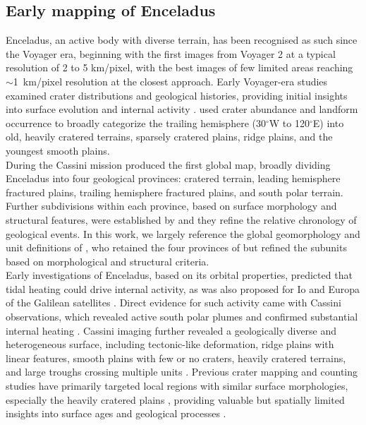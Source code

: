 \documentclass[preprint,11pt,3p,times,authoryear]{elsarticle}
\begin{document}
\subsection{Early mapping of Enceladus}
Enceladus, an active body with diverse terrain, has been recognised as such since the Voyager era, beginning with the first images from Voyager 2 at a typical resolution of 2 to 5 km/pixel, with the best images of few limited areas reaching $\sim$1~km/pixel resolution at the closest approach. Early Voyager-era studies examined crater distributions and geological histories, providing initial insights into surface evolution and internal activity \citep{Smith1982, Plescia1983, Schenk1989, Pozio1990, Kargel1996}. \citet{Smith1982} used crater abundance and landform occurrence to broadly categorize the trailing hemisphere (30$^\circ$W to 120$^\circ$E) into old, heavily cratered terrains, sparsely cratered plains, ridge plains, and the youngest smooth plains. \\

During the Cassini mission \citet{Spencer2009} produced the first global map, broadly dividing Enceladus into four geological provinces: cratered terrain, leading hemisphere fractured plains, trailing hemisphere fractured plains, and south polar terrain. Further subdivisions within each province, based on surface morphology and structural features, were established by \citet{Helfenstein2010} and they refine the relative chronology of geological events. In this work, we largely reference the global geomorphology and unit definitions of \citet{CrowWillard2015}, who retained the four provinces of \citet{Spencer2009} but refined the subunits based on morphological and structural criteria.\\

Early investigations of Enceladus, based on its orbital properties, predicted that tidal heating could drive internal activity, as was also proposed for Io and Europa of the Galilean satellites \citep{Cassen1979, Peale1979}. Direct evidence for such activity came with Cassini observations, which revealed active south polar plumes and confirmed substantial internal heating \citep{Porco2006, Spencer2006}. Cassini imaging further revealed a geologically diverse and heterogeneous surface, including tectonic-like deformation, ridge plains with linear features, smooth plains with few or no craters, heavily cratered terrains, and large troughs crossing multiple units \citep{Helfenstein2010}. Previous crater mapping and counting studies have primarily targeted local regions with similar surface morphologies, especially the heavily cratered plains \citep{Kirchoff2009, Kinczyk2024, Blanco-Rojas2024}, providing valuable but spatially limited insights into surface ages and geological processes \citep{Kirchoff2010, Bland2012, Martin2017}.
\end{document}
